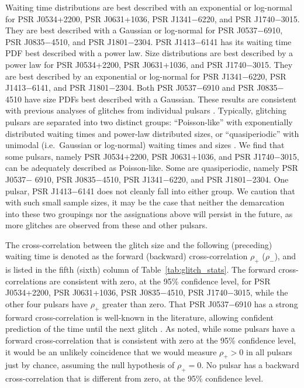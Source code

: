 Waiting time distributions are best described with an exponential or log-normal for PSR J0534+2200, PSR J0631+1036, PSR J1341$-$6220, and PSR J1740$-$3015. They are best described with a Gaussian or log-normal for PSR J0537$-$6910, PSR J0835$-$4510, and PSR J1801$-$2304. PSR J1413$-$6141 has its waiting time PDF best described with a power law. Size distributions are best described by a power law for PSR J0534+2200, PSR J0631+1036, and PSR J1740$-$3015. They are best described by an exponential or log-normal for PSR J1341$-$6220, PSR J1413$-$6141, and PSR J1801$-$2304. Both PSR J0537$-$6910 and PSR J0835$-$4510 have size PDFs best described with a Gaussian. These results are consistent with previous analyses of glitches from individual pulsars \citep{Melatos2008,Fuentes2017,Howitt2018,Fuentes2019}. Typically, glitching pulsars are separated into two distinct groups: ``Poisson-like'' with exponentially distributed waiting times and power-law distributed sizes, or ``quasiperiodic'' with unimodal (i.e.~Gaussian or log-normal) waiting times and sizes \citep{Melatos2008,Howitt2018}. We find that some pulsars, namely PSR J0534$+$2200, PSR J0631$+$1036, and PSR J1740$-$3015, can be adequately described as Poisson-like. Some are quasiperiodic, namely PSR J0537$-$ 6910, PSR J0835$-$4510, PSR J1341$-$6220, and PSR J1801$-$2304. One pulsar, PSR J1413$-$6141 does not cleanly fall into either group. We caution that with such small sample sizes, it may be the case that neither the demarcation into these two groupings nor the assignations above will persist in the future, as more glitches are observed from these and other pulsars.

The cross-correlation between the glitch size and the following (preceding) waiting time is denoted as the forward (backward) cross-correlation $\rho_+$ ($\rho_-$), and is listed in the fifth (sixth) column of Table~\ref{tab:glitch_stats}. The forward cross-correlations are consistent with zero, at the 95\% confidence level, for PSR J0534+2200, PSR J0631+1036, PSR J0835$-$4510, PSR J1740$-$3015, while the other four pulsars have $\rho_+$ greater than zero. That PSR J0537$-$6910 has a strong forward cross-correlation is well-known in the literature, allowing confident prediction of the time until the next glitch \citep{Middleditch2006,Ferdman2018,Antonopoulou2018,Ho2020}. As \citet{Fuentes2019} noted, while some pulsars have a forward cross-correlation that is consistent with zero at the 95\% confidence level, it would be an unlikely coincidence that we would measure $\rho_+ > 0$ in all pulsars just by chance, assuming the null hypothesis of $\rho_+ = 0$. No pulsar has a backward cross-correlation that is different from zero, at the 95\% confidence level.

